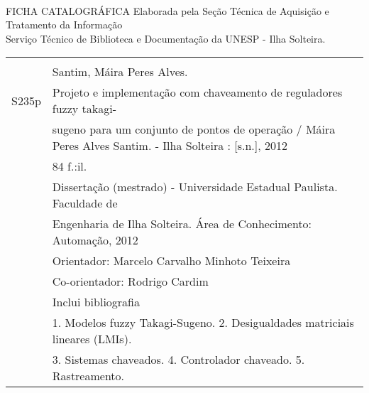 \begin{titlepage}
~
\vfill

\begin{espacosimples}
\bc
FICHA CATALOGRÁFICA
\ec
\bc
Elaborada pela Seção Técnica de Aquisição e Tratamento da Informação\\
Serviço Técnico de Biblioteca e Documentação da UNESP - Ilha Solteira.
\ec
\begin{small}
\begin{tabular}{|lp{13.2cm}|} \hline
\hspace{1cm} & \\
       & Santim, Máira Peres Alves. \\
S235p  & \hspace{0.6cm} Projeto e implementação com chaveamento de reguladores fuzzy takagi-\\
       &  sugeno para um conjunto de pontos de operação / Máira Peres Alves Santim. -\- Ilha Solteira : [s.n.], 2012 \\
       & \hspace{0.6cm} 84 f.:il.\\[4mm]
       & \hspace{0.6cm} Dissertação (mestrado) - Universidade Estadual Paulista. Faculdade de \\
       & Engenharia de Ilha Solteira. Área de Conhecimento: Automação, 2012\\[4mm]
       & \hspace{0.6cm} Orientador: Marcelo Carvalho Minhoto Teixeira\\[1mm]
       & \hspace{0.6cm} Co-orientador: Rodrigo Cardim\\[1mm]
       & \hspace{0.6cm} Inclui bibliografia\\[4mm]
       & \hspace{0.6cm} 1. Modelos fuzzy Takagi-Sugeno. 2. Desigualdades matriciais lineares (LMIs). \\
		   & 3. Sistemas chaveados. 4. Controlador chaveado. 5. Rastreamento.\\[4mm] \hline
\end{tabular}
\end{small}
\end{espacosimples}
\end{titlepage}

